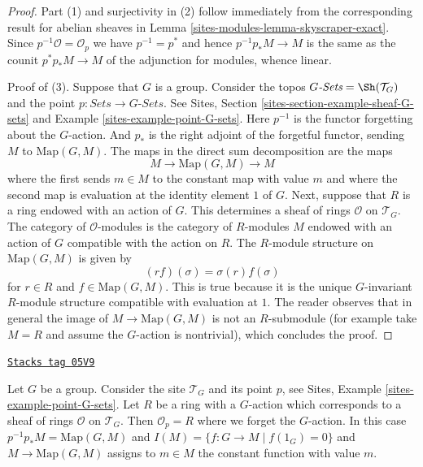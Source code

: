 \begin{proof}
Part (1) and surjectivity in (2)
follow immediately from the corresponding result for abelian
sheaves in
Lemma \ref{sites-modules-lemma-skyscraper-exact}.
Since $p^{-1}\mathcal{O} = \mathcal{O}_p$
we have $p^{-1} = p^*$ and hence $p^{-1}p_*M \to M$
is the same as the counit $p^*p_*M \to M$
of the adjunction for modules, whence linear.

\medskip\noindent
Proof of (3). Suppose that $G$ is a group. Consider the topos
$G\textit{-Sets} = \Sh(\mathcal{T}_G)$
and the point $p : \textit{Sets} \to G\textit{-Sets}$.
See Sites, Section \ref{sites-section-example-sheaf-G-sets} and
Example \ref{sites-example-point-G-sets}.
Here $p^{-1}$ is the functor forgetting
about the $G$-action. And $p_*$ is the right adjoint
of the forgetful functor, sending $M$ to $\text{Map}(G, M)$.
The maps in the direct sum decomposition are the maps
$$
M \to \text{Map}(G, M) \to M
$$
where the first sends $m \in M$ to the constant map with value $m$ and
where the second map is evaluation at the identity element $1$ of $G$.
Next, suppose that $R$ is a ring endowed with an action of $G$.
This determines a sheaf of rings $\mathcal{O}$ on $\mathcal{T}_G$.
The category of $\mathcal{O}$-modules is the category of $R$-modules $M$
endowed with an action of $G$ compatible with the action on $R$.
The $R$-module structure on $\text{Map}(G, M)$ is given by
$$
( r f ) (\sigma) = \sigma(r) f(\sigma)
$$
for $r \in R$ and $f \in \text{Map}(G, M)$. This is true because it is the
unique $G$-invariant $R$-module structure compatible with evaluation at $1$.
The reader observes that in general the image of $M \to \text{Map}(G, M)$
is not an $R$-submodule (for example take $M = R$ and assume the
$G$-action is nontrivial), which concludes the proof.
\end{proof}

\begin{example}
\label{sites-modules-example-ring-with-group-action}
\href{https://stacks.math.columbia.edu/tag/05V9}{\texttt{Stacks tag 05V9}}

Let $G$ be a group. Consider the site
$\mathcal{T}_G$ and its point $p$, see
Sites, Example \ref{sites-example-point-G-sets}.
Let $R$ be a ring with a $G$-action which corresponds to
a sheaf of rings $\mathcal{O}$ on $\mathcal{T}_G$.
Then $\mathcal{O}_p = R$ where we forget the $G$-action.
In this case $p^{-1}p_*M = \text{Map}(G, M)$ and
$I(M) = \{f : G \to M \mid f(1_G) = 0\}$ and
$M \to \text{Map}(G, M)$ assigns to $m \in M$ the constant
function with value $m$.
\end{example}

